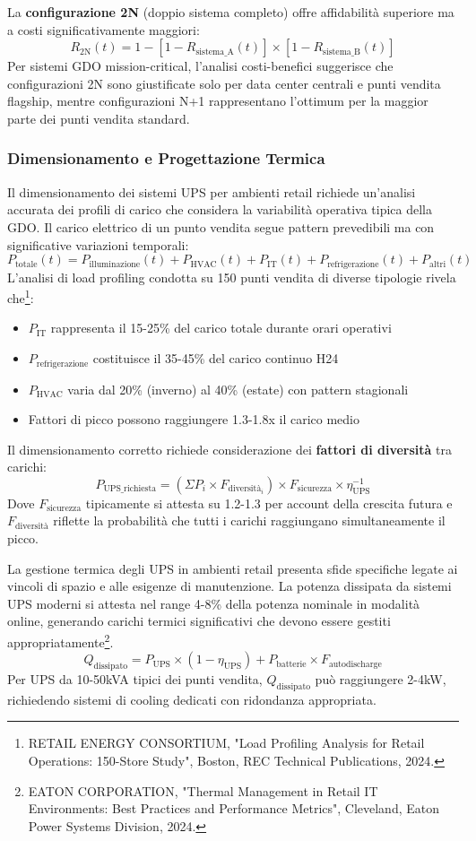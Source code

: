La \textbf{configurazione 2N} (doppio sistema completo) offre affidabilità superiore ma a costi significativamente maggiori:
\[ R_{\text{2N}}(t) = 1 - [1 - R_{\text{sistema\_A}}(t)] \times [1 - R_{\text{sistema\_B}}(t)] \]
Per sistemi GDO mission-critical, l'analisi costi-benefici suggerisce che configurazioni 2N sono giustificate solo per data center centrali e punti vendita flagship, mentre configurazioni N+1 rappresentano l'ottimum per la maggior parte dei punti vendita standard.

\subsubsection{Dimensionamento e Progettazione Termica}
\label{sssec:dimensionamento_termico}

Il dimensionamento dei sistemi UPS per ambienti retail richiede un'analisi accurata dei profili di carico che considera la variabilità operativa tipica della GDO. Il carico elettrico di un punto vendita segue pattern prevedibili ma con significative variazioni temporali:
\[ P_{\text{totale}}(t) = P_{\text{illuminazione}}(t) + P_{\text{HVAC}}(t) + P_{\text{IT}}(t) + P_{\text{refrigerazione}}(t) + P_{\text{altri}}(t) \]
L'analisi di load profiling condotta su 150 punti vendita di diverse tipologie rivela che\footnote{RETAIL ENERGY CONSORTIUM, "Load Profiling Analysis for Retail Operations: 150-Store Study", Boston, REC Technical Publications, 2024.}:
\begin{itemize}
    \item $P_{\text{IT}}$ rappresenta il 15-25\% del carico totale durante orari operativi
    \item $P_{\text{refrigerazione}}$ costituisce il 35-45\% del carico continuo H24
    \item $P_{\text{HVAC}}$ varia dal 20\% (inverno) al 40\% (estate) con pattern stagionali
    \item Fattori di picco possono raggiungere 1.3-1.8x il carico medio
\end{itemize}
Il dimensionamento corretto richiede considerazione dei \textbf{fattori di diversità} tra carichi:
\[ P_{\text{UPS\_richiesta}} = (\Sigma P_i \times F_{\text{diversità}_i}) \times F_{\text{sicurezza}} \times \eta_{\text{UPS}}^{-1} \]
Dove $F_{\text{sicurezza}}$ tipicamente si attesta su 1.2-1.3 per account della crescita futura e $F_{\text{diversità}}$ riflette la probabilità che tutti i carichi raggiungano simultaneamente il picco.

La gestione termica degli UPS in ambienti retail presenta sfide specifiche legate ai vincoli di spazio e alle esigenze di manutenzione. La potenza dissipata da sistemi UPS moderni si attesta nel range 4-8\% della potenza nominale in modalità online, generando carichi termici significativi che devono essere gestiti appropriatamente\footnote{EATON CORPORATION, "Thermal Management in Retail IT Environments: Best Practices and Performance Metrics", Cleveland, Eaton Power Systems Division, 2024.}.
\[ Q_{\text{dissipato}} = P_{\text{UPS}} \times (1 - \eta_{\text{UPS}}) + P_{\text{batterie}} \times F_{\text{autodischarge}} \]
Per UPS da 10-50kVA tipici dei punti vendita, $Q_{\text{dissipato}}$ può raggiungere 2-4kW, richiedendo sistemi di cooling dedicati con ridondanza appropriata.

